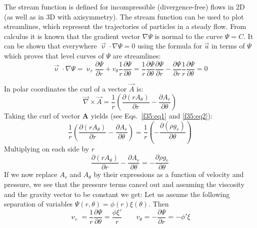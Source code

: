 The stream function is defined for incompressible (divergence-free) 
flows in 2D (as well as in 3D with axisymmetry).
The stream function can be used to plot streamlines, 
which represent the trajectories of particles in a steady flow.
From calculus it is known that the gradient vector $\nabla \Psi$
is normal to the curve $\Psi =C$. 
It can be shown that everywhere ${\vec{\upnu}}\cdot \nabla \Psi =0$ 
using the formula for $\vec{u}$ in terms of 
$\Psi$ which proves that level curves of $\Psi$ are streamlines:
\[
{\vec \upnu}\cdot \nabla \Psi 
= \upnu_r \frac{\partial \Psi}{\partial r} + v_\theta \frac{1}{r} \frac{\partial \Psi}{\partial \theta} 
= \frac{1}{r}\frac{\partial \Psi}{\partial \theta} \frac{\partial \Psi}{\partial r} 
- \frac{\partial \Psi}{\partial r} \frac{1}{r} \frac{\partial \Psi}{\partial \theta} 
=0
\] 

In polar coordinates the curl of a vector ${\vec A}$ is:
\[
{\vec \nabla}\times {\vec A}
=
\frac{1}{r}\left(  
\frac{\partial (r A_\theta)}{\partial r}
-
\frac{\partial A_r}{\partial \theta}
\right)
\]
Taking the curl of vector ${\bm A}$ yields (see Eqs.~\eqref{f35:eq1} and \eqref{f35:eq2}):
\[
\frac{1}{r}\left(  
\frac{\partial (r A_\theta)}{\partial r}
- \frac{\partial A_r}{\partial \theta}
\right)
=
\frac{1}{r}\left(  
- \frac{\partial (\rho g_r)}{\partial \theta}
\right)
\]
Multiplying on each side by $r$ 
\[
\frac{\partial (r A_\theta)}{\partial r}
- \frac{\partial A_r}{\partial \theta}
=
- \frac{\partial \rho g_r}{\partial \theta}
\]
If we now replace $A_r$ and $A_\theta$ by their expressions as a function of velocity and pressure, 
we see that the pressure terms cancel out 
and assuming the viscosity and the gravity vector to be constant we get:
Let us assume the following separation of variables $\boxed{\Psi(r,\theta)=\phi(r)\xi(\theta)}$.
Then 
\[
\upnu_r = \frac{1}{r}\frac{\partial \Psi}{\partial \theta} = \frac{\phi \xi'}{r}
\quad\quad
v_\theta = - \frac{\partial \Psi}{\partial r} = -\phi' \xi
\]


